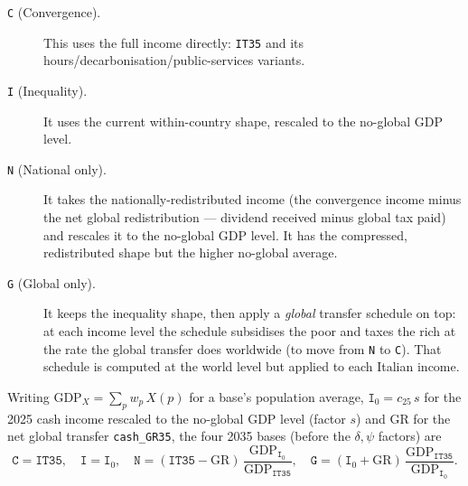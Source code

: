 \documentclass[12pt,a4paper]{article}
\newcommand{\scenario}[1]{\texttt{#1}}
\newcommand{\col}[1]{\texttt{#1}}
\begin{document}
\begin{description}
  \item[\scenario{C} (Convergence).] This uses the \citet{Bothe2026} full income directly: \col{IT35} and its hours/decarbonisation/public-services variants.
  \item[\scenario{I} (Inequality).] It uses the current within-country shape, rescaled to the no-global GDP level. 
  \item[\scenario{N} (National only).] It takes the   nationally-redistributed income (the convergence income minus the net global redistribution --- dividend received minus global tax paid) and rescales it to the no-global GDP level. It has the compressed, redistributed shape but the higher no-global average.
  \item[\scenario{G} (Global only).] It keeps the inequality shape, then apply a \emph{global} transfer schedule on top: at each income level the schedule subsidises the poor and taxes the rich at the rate the global transfer does worldwide (to move from \scenario{N} to \scenario{C}). That schedule is computed at the world level but applied to each Italian income.
\end{description}

Writing $\mathrm{GDP}_X=\sum_p w_p\,X(p)$ for a base's population average, $\scenario{I}_0=c_{25}\,s$ for the 2025 cash income rescaled to the no-global GDP level (factor $s$) and $\mathrm{GR}$ for the net global transfer \col{cash\_GR35}, the four 2035 bases (before the $\delta,\psi$ factors) are
\[
  \scenario{C}=\col{IT35},\quad
  \scenario{I}=\scenario{I}_0,\quad
  \scenario{N}=(\col{IT35}-\mathrm{GR})\,\frac{\mathrm{GDP}_{\scenario{I}_0}}{\mathrm{GDP}_{\col{IT35}}},\quad
  \scenario{G}=(\scenario{I}_0+\mathrm{GR})\,\frac{\mathrm{GDP}_{\col{IT35}}}{\mathrm{GDP}_{\scenario{I}_0}}.
\]
\end{document}
